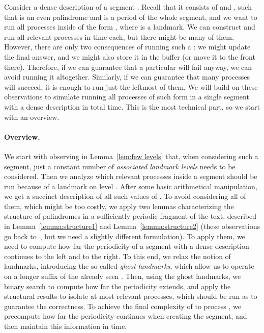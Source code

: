 \documentclass{article}[11pt,letter]
\begin{document}
Consider a dense description of a segment . Recall that it consists of  and , such that  is an even palindrome
and  is a period of the whole segment, and we want to run
all processes  inside  of the form , where  is a landmark.
We can construct and run all relevant processes in  time each, but there might be many of them. However, there are
only two consequences of running such a : we might update the final answer, and we might also store it in the buffer (or move it to the front there).
Therefore, if we can guarantee that a particular  will fail anyway, we can avoid running it altogether. Similarly, if we can guarantee that many
processes  will succeed, it is enough to run just the  leftmost of them.
We will build on these observations to simulate running all processes of such form in a single segment with a dense description in  total time.
This is the most technical part, so we start with an overview.

\paragraph{Overview.}   We start with observing in Lemma~\ref{lem:few levels} that, when considering such a segment, just a constant number of \emph{associated landmark
levels} needs to be considered. Then we analyze which relevant processes inside a segment should be run because of a landmark on level .
After some basic arithmetical manipulation, we get a succinct description of all such values of . To avoid considering all of them, which
might be too costly, we apply two lemmas characterizing the structure of palindromes in a sufficiently periodic fragment of the text,
described in Lemma~\ref{lemma:structure1} and Lemma~\ref{lemma:structure2} (these observations go back to~\cite{Apostolico}, but we need
a slightly different formulation). To apply them, we need to compute how far the periodicity of a segment with a dense description continues
to the left and to the right. To this end, we relax the notion of landmarks, introducing the so-called \emph{ghost landmarks}, which allow us to
operate on a longer suffix of the already seen . Then, using the ghost landmarks, we binary search to compute how far
the periodicity extends, and apply the structural results to isolate at most  relevant processes, which should be run as to guarantee
the correctness. To achieve the final complexity of   to process , we precompute how far the
periodicity continues when creating the segment, and then maintain this information in  time.
\end{document}
